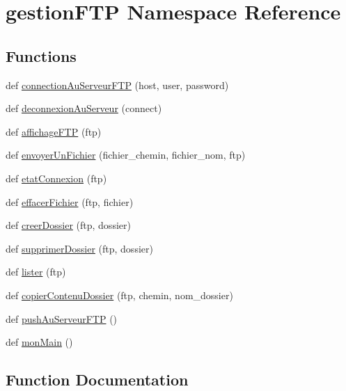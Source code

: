 \hypertarget{namespacegestion_f_t_p}{}\section{gestion\+F\+TP Namespace Reference}
\label{namespacegestion_f_t_p}
\subsection*{Functions}
\begin{DoxyCompactItemize}
\item 
def \hyperlink{namespacegestion_f_t_p_ac302a85ee832b8ee7df6332236fb03fd}{connection\+Au\+Serveur\+F\+TP} (host, user, password)
\item 
def \hyperlink{namespacegestion_f_t_p_ad8f6cfbd9c6f0f416388cda6be0006a1}{deconnexion\+Au\+Serveur} (connect)
\item 
def \hyperlink{namespacegestion_f_t_p_af55225f5cdcb61a67ac02eeebf5f3860}{affichage\+F\+TP} (ftp)
\item 
def \hyperlink{namespacegestion_f_t_p_ae9eaad537c75d8beb4d50100f6b7eb53}{envoyer\+Un\+Fichier} (fichier\+\_\+chemin, fichier\+\_\+nom, ftp)
\item 
def \hyperlink{namespacegestion_f_t_p_a18440a52ad61b01732d15fcbd809f0d6}{etat\+Connexion} (ftp)
\item 
def \hyperlink{namespacegestion_f_t_p_aa5e571d2a08d3a629af8934d539efdd5}{effacer\+Fichier} (ftp, fichier)
\item 
def \hyperlink{namespacegestion_f_t_p_a4f578f0eb414b4cf018e728e673d1b8e}{creer\+Dossier} (ftp, dossier)
\item 
def \hyperlink{namespacegestion_f_t_p_a9d2f5ec25bb3819b33f44983216f7f9b}{supprimer\+Dossier} (ftp, dossier)
\item 
def \hyperlink{namespacegestion_f_t_p_a0b92822e6b7f5190f17191696cc45236}{lister} (ftp)
\item 
def \hyperlink{namespacegestion_f_t_p_a896f323f39f972a38433e3f8dfae7eab}{copier\+Contenu\+Dossier} (ftp, chemin, nom\+\_\+dossier)
\item 
def \hyperlink{namespacegestion_f_t_p_ae6c72baede960f1d7c8722c2421eece3}{push\+Au\+Serveur\+F\+TP} ()
\item 
def \hyperlink{namespacegestion_f_t_p_a60eb7697458514d4a24011cab1c4d559}{mon\+Main} ()
\end{DoxyCompactItemize}


\subsection{Function Documentation}
